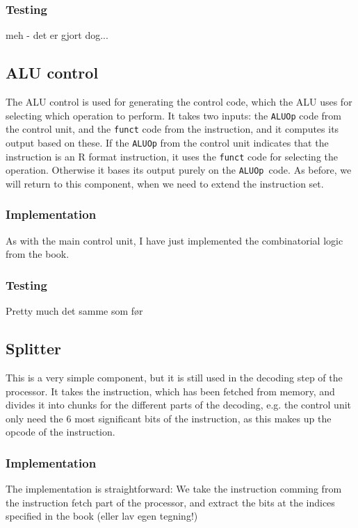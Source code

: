 \subsubsection*{Testing}
meh - det er gjort dog...

\subsection{ALU control}\label{sec:alu-control}
The ALU control is used for generating the control code, which the ALU uses for
selecting which operation to perform. It takes two inputs: the \texttt{ALUOp}
code from the control unit, and the \texttt{funct} code from the instruction,
and it computes its output based on these. If the \texttt{ALUOp} from the
control unit indicates that the instruction is an R format instruction, it uses
the \texttt{funct} code for selecting the operation. Otherwise it bases its
output purely on the \texttt{ALUOp} code. As before, we will return to this
component, when we need to extend the instruction set.

\subsubsection*{Implementation}
As with the main control unit, I have just implemented the combinatorial logic
from the book.

\subsubsection*{Testing}
Pretty much det samme som før

\subsection{Splitter}
This is a very simple component, but it is still used in the decoding step of
the processor. It takes the instruction, which has been fetched from memory,
and divides it into chunks for the different parts of the decoding, e.g. the
control unit only need the 6 most significant bits of the instruction, as this
makes up the opcode of the instruction.

\subsubsection*{Implementation}
The implementation is straightforward: We take the instruction comming from the
instruction fetch part of the processor, and extract the bits at the indices
specified in the book (eller lav egen tegning!)

